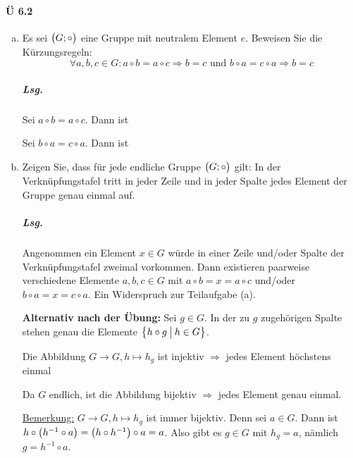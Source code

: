 \documentclass{scrreprt}
\begin{document}
\paragraph{Ü 6.2}
\begin{enumerate}[(a)]
\item Es sei $\qty\big(G; \circ)$ eine Gruppe mit neutralem Element $e$.
  Beweisen Sie die Kürzungsregeln:
  \[
    \forall a, b, c \in G \colon
    a \circ b = a \circ c \Rightarrow b = c
    \text{ und }
    b \circ a = c \circ a \Rightarrow b = c
  \]

  \subparagraph{Lsg.} Sei $a \circ b = a \circ c$.
  Dann ist

  Sei $b \circ a = c \circ a$.
  Dann ist

\item Zeigen Sie, dass für jede endliche Gruppe $\qty\big(G; \circ)$ gilt:
  In der Verknüpfungstafel tritt in jeder Zeile und in jeder Spalte jedes
  Element der Gruppe genau einmal auf.

  \subparagraph{Lsg.} Angenommen ein Element $x \in G$ würde in einer Zeile
  und/oder Spalte der Verknüpfungstafel zweimal vorkommen.
  Dann existieren paarweise verschiedene Elemente $a, b, c \in G$ mit
  $a \circ b = x = a \circ c$ und/oder $b \circ a = x = c \circ a$.
  Ein Widerspruch zur Teilaufgabe (a).

  \textbf{Alternativ nach der Übung:} Sei $g \in G$.
  In der zu $g$ zugehörigen Spalte stehen genau die Elemente $\qty\big{h \circ g \:\big|\: h \in G}$.

  Die Abbildung $G \to G, h \mapsto h_g$ ist injektiv $\Rightarrow$ jedes Element höchstens einmal

  Da $G$ endlich, ist die Abbildung bijektiv $\Rightarrow$ jedes Element genau einmal.

  \underline{Bemerkung:} $G \to G, h \mapsto h_g$ ist immer bijektiv.
  Denn sei $a \in G$.
  Dann ist $h \circ \qty\big(h^{-1} \circ a) = \qty\big(h \circ h^{-1}) \circ a = a$.
  Also gibt es $g \in G$ mit $h_g = a$, nämlich $g = h^{-1} \circ a$.
\end{enumerate}
\end{document}
